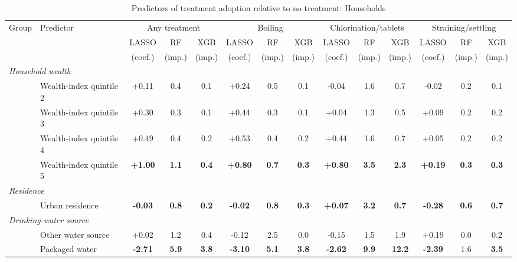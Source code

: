 \begin{landscape}
\begin{table}[p]\centering
\caption{Predictors of treatment adoption relative to no treatment: Households}
\label{tab:characteristics-by-treatment-hh}
\tiny\setlength{\tabcolsep}{1.8pt}\renewcommand{\arraystretch}{0.88}
\begin{adjustbox}{max width=\textwidth,center}
\begin{tabular}{ll*{12}{c}}
\toprule
Group & Predictor & \multicolumn{3}{c}{Any treatment} & \multicolumn{3}{c}{Boiling} & \multicolumn{3}{c}{Chlorination/tablets} & \multicolumn{3}{c}{Straining/settling} \\
 & & LASSO & RF & XGB & LASSO & RF & XGB & LASSO & RF & XGB & LASSO & RF & XGB \\
 & & (coef.) & (imp.) & (imp.) & (coef.) & (imp.) & (imp.) & (coef.) & (imp.) & (imp.) & (coef.) & (imp.) & (imp.) \\
\cmidrule(lr){3-5}\cmidrule(lr){6-8}\cmidrule(lr){9-11}\cmidrule(lr){12-14}
\midrule
\multicolumn{14}{l}{\textit{Household wealth}} \\
 & Wealth-index quintile 2 & +0.11 & 0.4 & 0.1 & +0.24 & 0.5 & 0.1 & -0.04 & 1.6 & 0.7 & -0.02 & 0.2 & 0.1 \\
 & Wealth-index quintile 3 & +0.30 & 0.3 & 0.1 & +0.44 & 0.3 & 0.1 & +0.04 & 1.3 & 0.5 & +0.09 & 0.2 & 0.2 \\
 & Wealth-index quintile 4 & +0.49 & 0.4 & 0.2 & +0.53 & 0.4 & 0.2 & +0.44 & 1.6 & 0.7 & +0.05 & 0.2 & 0.2 \\
 & Wealth-index quintile 5 & \textbf{+1.00} & \textbf{1.1} & \textbf{0.4} & \textbf{+0.80} & \textbf{0.7} & \textbf{0.3} & \textbf{+0.80} & \textbf{3.5} & \textbf{2.3} & \textbf{+0.19} & \textbf{0.3} & \textbf{0.3} \\
\multicolumn{14}{l}{\textit{Residence}} \\
 & Urban residence & \textbf{-0.03} & \textbf{0.8} & \textbf{0.2} & \textbf{-0.02} & \textbf{0.8} & \textbf{0.3} & \textbf{+0.07} & \textbf{3.2} & \textbf{0.7} & \textbf{-0.28} & \textbf{0.6} & \textbf{0.7} \\
\multicolumn{14}{l}{\textit{Drinking-water source}} \\
 & Other water source & +0.02 & 1.2 & 0.4 & -0.12 & 2.5 & 0.0 & -0.15 & 1.5 & 1.9 & +0.19 & 0.0 & 0.2 \\
 & Packaged water & \textbf{-2.71} & \textbf{5.9} & \textbf{3.8} & \textbf{-3.10} & \textbf{5.1} & \textbf{3.8} & \textbf{-2.62} & \textbf{9.9} & \textbf{12.2} & \textbf{-2.39} & 1.6 & \textbf{3.5} \\

\end{tabular}
\end{adjustbox}
\end{table}
\end{landscape}
